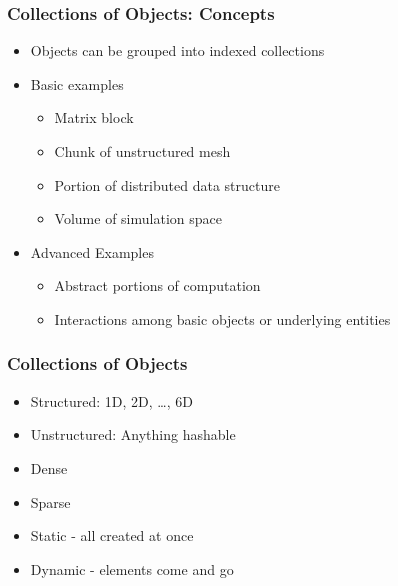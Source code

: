 

\begin{frame}[fragile]
  \frametitle{Collections of Objects: Concepts}
  \begin{itemize}
    \item Objects can be grouped into indexed collections
    \item Basic examples
      \begin{itemize}
      \item Matrix block
      \item Chunk of unstructured mesh
      \item Portion of distributed data structure
      \item Volume of simulation space
      \end{itemize}
      \pause
    \item Advanced Examples
      \begin{itemize}
      \item Abstract portions of computation
      \item Interactions among basic objects or underlying entities
      \end{itemize}
  \end{itemize}
\end{frame}

\begin{frame}[fragile]
  \frametitle{Collections of Objects}
  \begin{itemize}
    \item Structured: 1D, 2D, \ldots, 6D
    \item Unstructured: Anything hashable
      \pause
    \item Dense
    \item Sparse
      \pause
    \item Static - all created at once
    \item Dynamic - elements come and go
  \end{itemize}
\end{frame}

